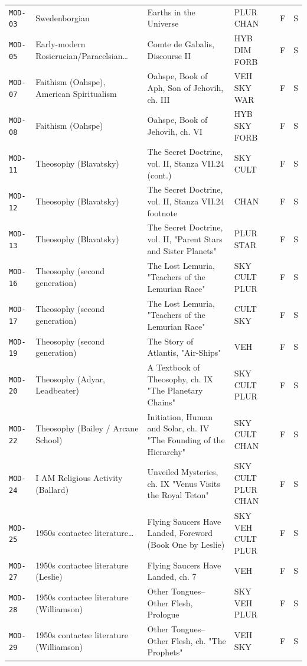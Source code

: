 \documentclass[11pt,a4paper]{article}
\begin{document}
\begin{longtable}{@{}p{1.6cm}p{3.6cm}p{6.9cm}p{2.1cm}cc@{}}
\texttt{MOD-03} & Swedenborgian & Earths in the Universe & PLUR CHAN & F & S \\
\texttt{MOD-05} & Early-modern Rosicrucian/Paracelsian… & Comte de Gabalis, Discourse II & HYB DIM FORB & F & S \\
\texttt{MOD-07} & Faithism (Oahspe), American Spiritualism & Oahspe, Book of Aph, Son of Jehovih, ch. III & VEH SKY WAR & F & S \\
\texttt{MOD-08} & Faithism (Oahspe) & Oahspe, Book of Jehovih, ch. VI & HYB SKY FORB & F & S \\
\texttt{MOD-11} & Theosophy (Blavatsky) & The Secret Doctrine, vol. II, Stanza VII.24 (cont.) & SKY CULT & F & S \\
\texttt{MOD-12} & Theosophy (Blavatsky) & The Secret Doctrine, vol. II, Stanza VII.24 footnote & CHAN & F & S \\
\texttt{MOD-13} & Theosophy (Blavatsky) & The Secret Doctrine, vol. II, "Parent Stars and Sister Planets" & PLUR STAR & F & S \\
\texttt{MOD-16} & Theosophy (second generation) & The Lost Lemuria, "Teachers of the Lemurian Race" & SKY CULT PLUR & F & S \\
\texttt{MOD-17} & Theosophy (second generation) & The Lost Lemuria, "Teachers of the Lemurian Race" & CULT SKY & F & S \\
\texttt{MOD-19} & Theosophy (second generation) & The Story of Atlantis, "Air-Ships" & VEH & F & S \\
\texttt{MOD-20} & Theosophy (Adyar, Leadbeater) & A Textbook of Theosophy, ch. IX "The Planetary Chains" & SKY CULT PLUR & F & S \\
\texttt{MOD-22} & Theosophy (Bailey / Arcane School) & Initiation, Human and Solar, ch. IV "The Founding of the Hierarchy" & SKY CULT CHAN & F & S \\
\texttt{MOD-24} & I AM Religious Activity (Ballard) & Unveiled Mysteries, ch. IX "Venus Visits the Royal Teton" & SKY CULT PLUR CHAN & F & S \\
\texttt{MOD-25} & 1950s contactee literature… & Flying Saucers Have Landed, Foreword (Book One by Leslie) & SKY VEH CULT PLUR & F & S \\
\texttt{MOD-27} & 1950s contactee literature (Leslie) & Flying Saucers Have Landed, ch. 7 & VEH & F & S \\
\texttt{MOD-28} & 1950s contactee literature (Williamson) & Other Tongues--Other Flesh, Prologue & SKY VEH PLUR & F & S \\
\texttt{MOD-29} & 1950s contactee literature (Williamson) & Other Tongues--Other Flesh, ch. "The Prophets" & VEH SKY & F & S \\

\end{longtable}
\end{document}
